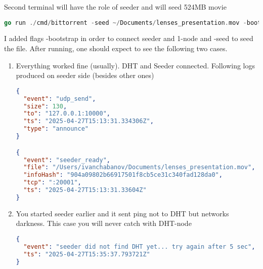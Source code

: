 \documentclass[11pt,a4paper]{article}
\begin{document}
\vspace{4mm} Second terminal will have the role of seeder and will seed 524MB movie
\begin{lstlisting}[language=go]
go run ./cmd/bittorrent -seed ~/Documents/lenses_presentation.mov -bootstrap :10000 -tcp-listen :20001 -dht-listen :20000 | jq .
\end{lstlisting}
I added flags -bootstrap in order to connect seeder and 1-node and -seed to seed the file.
After running, one should expect to see the following two cases.
\begin{enumerate}
  \item Everything worked fine (usually). DHT and Seeder connected. Following logs produced on seeder side (besides other ones) \begin{lstlisting}[language=json]
{
  "event": "udp_send",
  "size": 130,
  "to": "127.0.0.1:10000",
  "ts": "2025-04-27T15:13:31.334306Z",
  "type": "announce"
}

{
  "event": "seeder_ready",
  "file": "/Users/ivanchabanov/Documents/lenses_presentation.mov",
  "infoHash": "904a09802b66917501f8cb5ce31c340fad128da0",
  "tcp": ":20001",
  "ts": "2025-04-27T15:13:31.33604Z"
}
\end{lstlisting}
\item You started seeder earlier and it sent ping not to DHT but networks darkness. This case you will never catch with DHT-node \begin{lstlisting}[language=json]
{
  "event": "seeder did not find DHT yet... try again after 5 sec",
  "ts": "2025-04-27T15:35:37.793721Z"
}
\end{lstlisting}
\end{enumerate}
\end{document}
